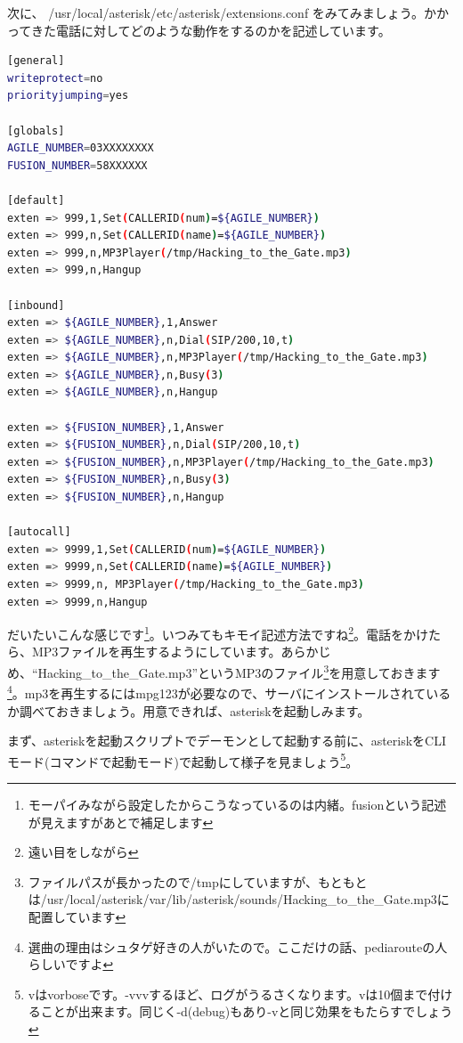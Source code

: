 次に、 /usr/local/asterisk/etc/asterisk/extensions.conf をみてみましょう。かかってきた電話に対してどのような動作をするのかを記述しています。

\begin{lstlisting}[language=bash]
[general] 
writeprotect=no 
priorityjumping=yes 

[globals] 
AGILE_NUMBER=03XXXXXXXX
FUSION_NUMBER=58XXXXXX

[default] 
exten => 999,1,Set(CALLERID(num)=${AGILE_NUMBER}) 
exten => 999,n,Set(CALLERID(name)=${AGILE_NUMBER})
exten => 999,n,MP3Player(/tmp/Hacking_to_the_Gate.mp3) 
exten => 999,n,Hangup 

[inbound] 
exten => ${AGILE_NUMBER},1,Answer 
exten => ${AGILE_NUMBER},n,Dial(SIP/200,10,t) 
exten => ${AGILE_NUMBER},n,MP3Player(/tmp/Hacking_to_the_Gate.mp3) 
exten => ${AGILE_NUMBER},n,Busy(3)
exten => ${AGILE_NUMBER},n,Hangup 

exten => ${FUSION_NUMBER},1,Answer
exten => ${FUSION_NUMBER},n,Dial(SIP/200,10,t)
exten => ${FUSION_NUMBER},n,MP3Player(/tmp/Hacking_to_the_Gate.mp3)
exten => ${FUSION_NUMBER},n,Busy(3) 
exten => ${FUSION_NUMBER},n,Hangup

[autocall]
exten => 9999,1,Set(CALLERID(num)=${AGILE_NUMBER})
exten => 9999,n,Set(CALLERID(name)=${AGILE_NUMBER})
exten => 9999,n, MP3Player(/tmp/Hacking_to_the_Gate.mp3)
exten => 9999,n,Hangup

\end{lstlisting}

だいたいこんな感じです\footnote{モーパイみながら設定したからこうなっているのは内緒。fusionという記述が見えますがあとで補足します}。いつみてもキモイ記述方法ですね\footnote{遠い目をしながら}。電話をかけたら、MP3ファイルを再生するようにしています。あらかじめ、``Hacking\_to\_the\_Gate.mp3''というMP3のファイル\footnote{ファイルパスが長かったので/tmpにしていますが、もともとは/usr/local/asterisk/var/lib/asterisk/sounds/Hacking\_to\_the\_Gate.mp3に配置しています}を用意しておきます\footnote{選曲の理由はシュタゲ好きの人がいたので。ここだけの話、pediarouteの人らしいですよ}。mp3を再生するにはmpg123が必要なので、サーバにインストールされているか調べておきましょう。用意できれば、asteriskを起動しみます。

まず、asteriskを起動スクリプトでデーモンとして起動する前に、asteriskをCLIモード(コマンドで起動モード)で起動して様子を見ましょう\footnote{vはvorboseです。-vvvするほど、ログがうるさくなります。vは10個まで付けることが出来ます。同じく-d(debug)もあり-vと同じ効果をもたらすでしょう}。

